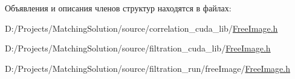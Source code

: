 Объявления и описания членов структур находятся в файлах:\begin{CompactItemize}
\item 
D:/Projects/MatchingSolution/source/correlation\_\-cuda\_\-lib/\hyperlink{correlation__cuda__lib_2_free_image_8h}{FreeImage.h}\item 
D:/Projects/MatchingSolution/source/filtration\_\-cuda\_\-lib/\hyperlink{filtration__cuda__lib_2_free_image_8h}{FreeImage.h}\item 
D:/Projects/MatchingSolution/source/filtration\_\-run/freeImage/\hyperlink{filtration__run_2free_image_2_free_image_8h}{FreeImage.h}\end{CompactItemize}
